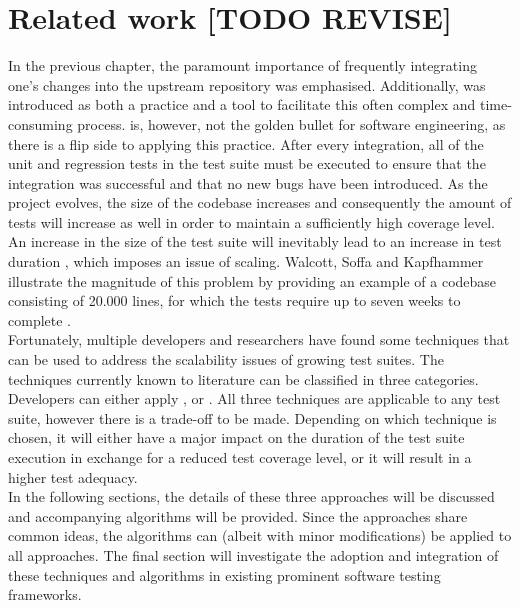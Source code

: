 
\chapter{Related work [TODO REVISE]}
\label{ch:related-work}
In the previous chapter, the paramount importance of frequently integrating one's changes into the upstream repository was emphasised. Additionally, \CI{} was introduced as both a practice and a tool to facilitate this often complex and time-consuming process. \CI{} is, however, not the golden bullet for software engineering, as there is a flip side to applying this practice. After every integration, all of the unit and regression tests in the test suite must be executed to ensure that the integration was successful and that no new bugs have been introduced. As the project evolves, the size of the codebase increases and consequently the amount of tests will increase as well in order to maintain a sufficiently high coverage level. An increase in the size of the test suite will inevitably lead to an increase in test duration \cite{evaluationoftestsuiteminimization}, which imposes an issue of scaling. Walcott, Soffa and Kapfhammer illustrate the magnitude of this problem by providing an example of a codebase consisting of 20.000 lines, for which the tests require up to seven weeks to complete \cite{10.1145/1146238.1146240}.\\

\noindent Fortunately, multiple developers and researchers have found some techniques that can be used to address the scalability issues of growing test suites. The techniques currently known to literature can be classified in three categories. Developers can either apply \emph{\tsm{}}, \emph{\tcs{}} or \emph{\tcp{}} \cite{evaluationoftestsuiteminimization}. All three techniques are applicable to any test suite, however there is a trade-off to be made. Depending on which technique is chosen, it will either have a major impact on the duration of the test suite execution in exchange for a reduced test coverage level, or it will result in a higher test adequacy.\\

\noindent In the following sections, the details of these three approaches will be discussed and accompanying algorithms will be provided. Since the approaches share common ideas, the algorithms can (albeit with minor modifications) be applied to all approaches. The final section will investigate the adoption and integration of these techniques and algorithms in existing prominent software testing frameworks.


\newpage

\newpage
